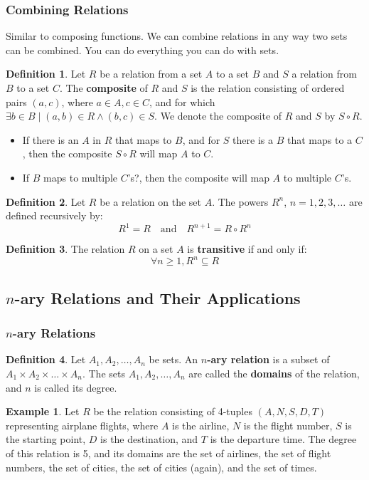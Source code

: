 \documentclass[article, 12pt]{article}
\theoremstyle{definition}
\newtheorem{example}{Example}
\newtheorem{definition}{Definition}
\newcommand{\comp}{\circ} %
\begin{document}
    \subsubsection{Combining Relations}
    Similar to composing functions. We can combine relations in any way two sets can be combined. You can do everything you can do with sets. 
    \begin{definition}
        Let $R$ be a relation from a set $A$ to a set $B$ and $S$ a relation from $B$ to a set $C$. The \textbf{composite} of $R$ and $S$ is the relation consisting of ordered pairs $(a,c)$, where $a \in A, c \in C$, and for which $\exists b \in B \mid (a,b) \in R \land (b,c) \in S$. We denote the composite of $R$ and $S$ by $S \comp R$.
    \end{definition}
    \begin{itemize}
        \item If there is an $A$ in $R$ that maps to $B$, and for $S$ there is a $B$ that maps to a $C$, then the composite $S \comp R$ will map $A$ to $C$.
        \item If $B$ maps to multiple $C$'s?, then the composite will map $A$ to multiple $C$'s.
    \end{itemize}
    \begin{definition}\label{def:reflexive powers}
        Let $R$ be a relation on the set $A$. The powers $R^n$, $n=1,2,3,\dots$ are defined recursively by:
            \[ R^1 = R \quad \text{and} \quad R^{n+1} = R \comp R^n \]
    \end{definition}
    \begin{definition}\label{def:transitive theorem}
        The relation $R$ on a set $A$ is \textbf{transitive} if and only if: 
        \[ \forall n \geq 1, R^n \subseteq R \]
    \end{definition}
    \subsection{$n$-ary Relations and Their Applications}
    \setcounter{definition}{0}
    \setcounter{example}{0}
    \subsubsection{$n$-ary Relations}
    \begin{definition}\label{def:nary}
        Let $A_1, A_2, \dots, A_n$ be sets. An \textbf{$n$-ary relation} is a subset of $A_1 \times A_2 \times \dots \times A_n$. The sets $A_1, A_2, \dots, A_n$ are called the \textbf{domains} of the relation, and $n$ is called its degree.
    \end{definition}
    \begin{example}
        Let $R$ be the relation consisting of 4-tuples $(A, N, S, D, T)$ representing airplane flights, where $A$ is the airline, $N$ is the flight number, $S$ is the starting point, $D$ is the destination, and $T$ is the departure time. The degree of this relation is 5, and its domains are the set of airlines, the set of flight numbers, the set of cities, the set of cities (again), and the set of times. 
    \end{example}
\end{document}
